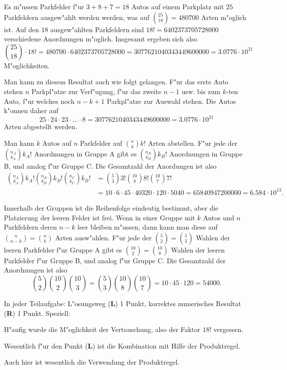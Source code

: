 \begin{loesung}
\begin{teilaufgaben}
\item Es m"ussen Parkfelder f"ur $3 + 8 + 7 = 18$ Autos auf einem
Parkplatz mit $25$ Parkfeldern ausgew"ahlt werden
werden, was auf $\binom{25}{18}=480700$ Arten m"oglich ist.
Auf den $18$ ausgew"ahlten Parkfeldern sind $18!=6402373705728000$
verschiedene Anordnungen m"oglich.
Insgesamt ergeben sich also
\[
\binom{25}{18}\cdot 18!=480700 \cdot 6402373705728000=3077621040343449600000
=3.0776\cdot10^{21}
\]
M"oglichkeiten.

Man kann zu diesem Resultat auch wie folgt gelangen.
F"ur das erste Auto stehen $n$ Parkpl"atze zur Verf"ugung, f"ur das zweite
$n-1$ usw. bis zum $k$-ten Auto, f"ur welches noch $n-k+1$ Parkpl"atze
zur Auswahl stehen. Die Autos k"onnen daher auf
\[
25\cdot
24\cdot
23\cdot
\dots
\cdot
8
=
3077621040343449600000
=3.0776\cdot10^{21}
\]
Arten abgestellt werden.
\item Man kann $k$ Autos auf $n$ Parkfelder auf $\binom{n}{k}k!$ Arten
abstellen. F"ur jede der $\binom{n_A}{k_A}k_A!$ Anordnungen in Gruppe A gibt es 
$\binom{n_B}{k_B}k_B!$ Anordnungen in Gruppe B, und analog f"ur Gruppe C.
Die Gesamtzahl der Anordungen ist also
\begin{align*}
\binom{n_A}{k_A}k_A!
\binom{n_B}{k_B}k_B!
\binom{n_C}{k_C}k_B!
&=
\binom{5}{3}3!
\binom{10}{8}8!
\binom{10}{7}7!
\\
&=10\cdot 6\cdot 45\cdot 40320\cdot 120\cdot 5040=65840947200000=6.584\cdot10^{13}.
\end{align*}
\item Innerhalb der Gruppen ist die Reihenfolge eindeutig bestimmt, aber
die Platzierung der leeren Felder ist frei.
Wenn in einer Gruppe mit $k$ Autos und $n$ Parkfeldern deren $n-k$
leer bleiben m"ussen,
dann kann man diese auf $\binom{n}{n-k}=\binom{n}{k}$ Arten ausw"ahlen.
F"ur jede der $\binom{5}{2}=\binom{5}{3}$ Wahlen der leeren Parkfelder
f"ur Gruppe A gibt es $\binom{10}{2}=\binom{10}{8}$ Wahlen der
leeren Parkfelder f"ur Gruppe B, und analog f"ur Gruppe C.
Die Gesamtzahl der Anordnungen ist also
\[
\binom{5}{2}
\binom{10}{2}
\binom{10}{3}
=
\binom{5}{3}
\binom{10}{8}
\binom{10}{7}
=10\cdot 45\cdot 120=54000.
\]
\end{teilaufgaben}
\end{loesung}

\begin{bewertung}
\begin{teilaufgaben}
In jeder Teilaufgabe: L"osungsweg ({\bf L}) 1 Punkt, korrektes numerisches
Resultat ({\bf R}) 1 Punkt. Speziell:
\begin{teilaufgaben}
\item H"aufig wurde die M"oglichkeit der Vertauschung, also der Faktor
$18!$ vergessen.
\item Wesentlich f"ur den Punkt ({\bf L}) ist die Kombination mit Hilfe
der Produktregel.
\item Auch hier ist wesentlich die Verwendung der Produktregel.
\end{teilaufgaben}
\end{teilaufgaben}
\end{bewertung}
